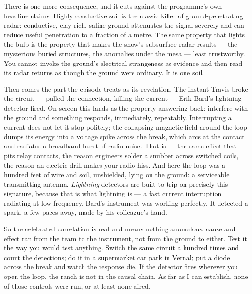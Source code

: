 There is one more consequence, and it cuts against the programme's own headline claims. Highly
conductive soil is the classic killer of ground-penetrating radar: conductive, clay-rich, saline
ground attenuates the signal severely and can reduce useful penetration to a fraction of a metre.
The same property that lights the bulb is the property that makes the show's subsurface radar
results --- the mysterious buried structures, the anomalies under the mesa --- least trustworthy.
You cannot invoke the ground's electrical strangeness as evidence and then read its radar returns
as though the ground were ordinary. It is one soil.

Then comes the part the episode treats as its revelation. The instant Travis broke the circuit ---
pulled the connection, killing the current --- Erik Bard's lightning detector fired. On screen this
lands as the property answering back: interfere with the ground and something responds,
immediately, repeatably.  Interrupting a current does not let it stop politely; the
collapsing magnetic field around the loop dumps its energy into a voltage spike across the break,
which arcs at the contact and radiates a broadband burst of radio noise. That is  --- the same effect that pits relay contacts, the reason engineers solder a snubber across
switched coils, the reason an electric drill makes your radio hiss. And here the loop was a hundred
feet of wire and soil, unshielded, lying on the ground: a serviceable transmitting antenna.
\emph{Lightning} detectors are built to trip on precisely this signature, because that is what
lightning is --- a fast current interruption radiating at low frequency. Bard's instrument was
working perfectly. It detected a spark, a few paces away, made by his colleague's hand.

So the celebrated correlation is real and means nothing anomalous: cause and effect ran from the
team to the instrument, not from the ground to either. Test it the way you would test anything.
Switch the same circuit a hundred times and count the detections; do it in a supermarket car park
in Vernal; put a diode across the break and watch the response die. If the detector fires wherever
you open the loop, the ranch is not in the causal chain. As far as I can establish, none of those
controls were run, or at least none aired.

